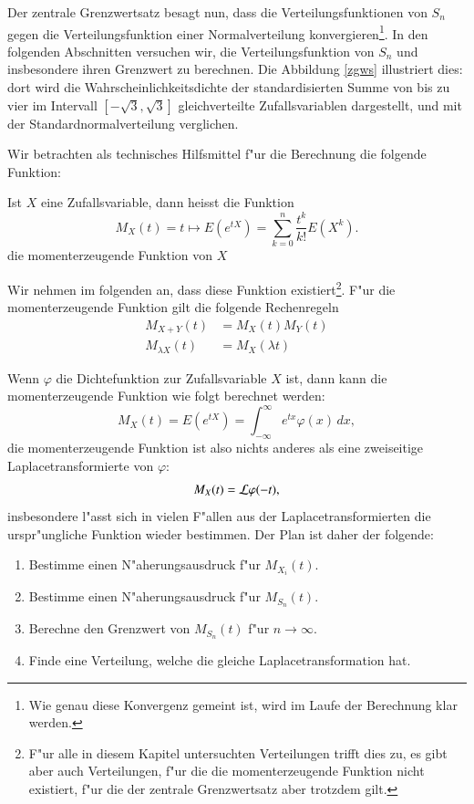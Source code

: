 Der zentrale Grenzwertsatz besagt nun, dass die Verteilungsfunktionen
von $S_n$ gegen die Verteilungsfunktion einer Normalverteilung
konvergieren\footnote{Wie genau diese Konvergenz gemeint ist, wird
im Laufe der Berechnung klar werden.}.
In den folgenden Abschnitten
versuchen wir, die Verteilungsfunktion von $S_n$ und insbesondere
ihren Grenzwert zu berechnen.
Die Abbildung \ref{zgws} illustriert
dies: dort wird die Wahrscheinlichkeitsdichte der standardisierten
Summe von bis zu vier im
Intervall $[-\sqrt{3},\sqrt{3}]$ gleichverteilte Zufallsvariablen dargestellt,
und mit der Standardnormalverteilung verglichen.

Wir betrachten als technisches Hilfsmittel f"ur die Berechnung
die folgende Funktion:
\begin{definition} Ist $X$ eine Zufallsvariable, dann heisst die Funktion
\[
M_X(t)=t\mapsto E(e^{tX})=\sum_{k=0}^n\frac{t^k}{k!}E(X^k).
\]
die momenterzeugende Funktion von $X$
\end{definition}
Wir nehmen im folgenden
an, dass diese Funktion existiert\footnote{F"ur alle in diesem Kapitel
untersuchten Verteilungen trifft dies zu, es gibt aber auch Verteilungen,
f"ur die die momenterzeugende Funktion nicht existiert, f"ur die der
zentrale Grenzwertsatz aber trotzdem gilt.}.
F"ur die momenterzeugende
Funktion gilt die folgende Rechenregeln
\begin{align*}
M_{X+Y}(t)&=M_X(t)M_Y(t)\\
M_{\lambda X}(t)&=M_X(\lambda t)
\end{align*}

Wenn $\varphi$ die Dichtefunktion zur Zufallsvariable $X$ ist, dann
kann die momenterzeugende Funktion wie folgt berechnet werden:
\[
M_X(t)=E(e^{tX})=\int_{-\infty}^\infty e^{tx}\varphi(x)\,dx,
\]
die momenterzeugende Funktion ist also nichts anderes als eine
zweiseitige Laplacetransformierte von $\varphi$:
\[
M_X(t)={\cal L}\varphi(-t),
\]
insbesondere l"asst sich in vielen F"allen aus der Laplacetransformierten
die urspr"ungliche Funktion wieder bestimmen.
Der Plan ist daher der folgende:
\begin{enumerate}
\item Bestimme einen N"aherungsausdruck f"ur $M_{X_i}(t)$.
\item Bestimme einen N"aherungsausdruck f"ur $M_{S_n}(t)$.
\item Berechne den Grenzwert von $M_{S_n}(t)$ f"ur $n\to\infty$.
\item Finde eine Verteilung, welche die gleiche Laplacetransformation
hat.
\end{enumerate}

